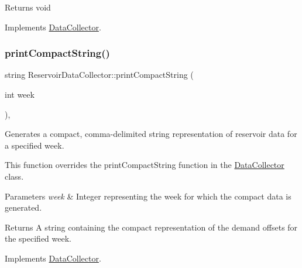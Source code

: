 \begin{DoxyReturn}{Returns}
void 
\end{DoxyReturn}


Implements \mbox{\hyperlink{classDataCollector_a01486bf58acbe37b203f97b3b9a79c40}{Data\+Collector}}.

\mbox{\label{classReservoirDataCollector_a0b68d7fa4a6d704350340d1ac3e8a1d2}} 
\subsubsection{\texorpdfstring{print\+Compact\+String()}{printCompactString()}}
{\footnotesize\ttfamily string Reservoir\+Data\+Collector\+::print\+Compact\+String (\begin{DoxyParamCaption}\item[{int}]{week }\end{DoxyParamCaption})\hspace{0.3cm}{\ttfamily [override]}, {\ttfamily [virtual]}}



Generates a compact, comma-\/delimited string representation of reservoir data for a specified week. 

This function overrides the {\ttfamily print\+Compact\+String} function in the {\ttfamily \mbox{\hyperlink{classDataCollector}{Data\+Collector}}} class.


\begin{DoxyParams}{Parameters}
{\em week} & Integer representing the week for which the compact data is generated.\\
\hline
\end{DoxyParams}
\begin{DoxyReturn}{Returns}
A string containing the compact representation of the demand offsets for the specified week. 
\end{DoxyReturn}


Implements \mbox{\hyperlink{classDataCollector_a2eac264fa5612aed5a830b12de4f4ae3}{Data\+Collector}}.

\mbox{\label{classReservoirDataCollector_aa8346433f037bbca41f3c8450f7f88cf}} 

